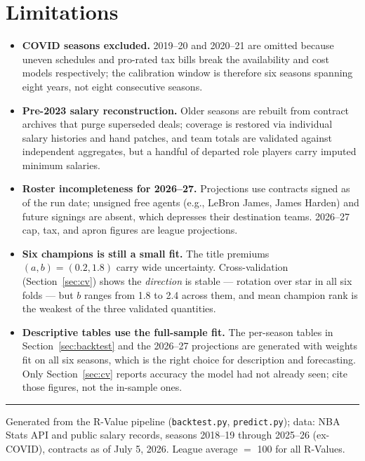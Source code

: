 \documentclass[11pt]{article}
\begin{document}
\section{Limitations}
\begin{itemize}[itemsep=2pt]
\item \textbf{COVID seasons excluded.} 2019--20 and 2020--21 are omitted
because uneven schedules and pro-rated tax bills break the availability and
cost models respectively; the calibration window is therefore six seasons
spanning eight years, not eight consecutive seasons.
\item \textbf{Pre-2023 salary reconstruction.} Older seasons are rebuilt from
contract archives that purge superseded deals; coverage is restored via
individual salary histories and hand patches, and team totals are validated
against independent aggregates, but a handful of departed role players carry
imputed minimum salaries.
\item \textbf{Roster incompleteness for 2026--27.} Projections use contracts
signed as of the run date; unsigned free agents (e.g., LeBron James, James
Harden) and future signings are absent, which depresses their destination
teams. 2026--27 cap, tax, and apron figures are league projections.
\item \textbf{Six champions is still a small fit.} The title premiums
$(a,b) = (0.2, 1.8)$ carry wide uncertainty. Cross-validation
(Section~\ref{sec:cv}) shows the \emph{direction} is stable --- rotation over
star in all six folds --- but $b$ ranges from 1.8 to 2.4 across them, and
mean champion rank is the weakest of the three validated quantities.
\item \textbf{Descriptive tables use the full-sample fit.} The per-season
tables in Section~\ref{sec:backtest} and the 2026--27 projections are
generated with weights fit on all six seasons, which is the right choice for
description and forecasting. Only Section~\ref{sec:cv} reports accuracy the
model had not already seen; cite those figures, not the in-sample ones.
\end{itemize}

\vspace{6pt}
\hrule
\vspace{4pt}
{\small Generated from the R-Value pipeline
(\texttt{backtest.py}, \texttt{predict.py}); data: NBA Stats API and public
salary records, seasons 2018--19 through 2025--26 (ex-COVID), contracts as of
July 5, 2026. League average $=$ 100 for all R-Values.}
\end{document}

